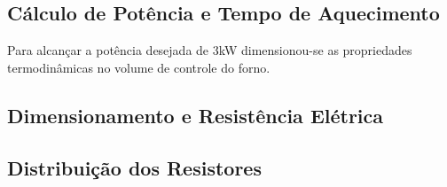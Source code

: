 \subsection{Cálculo de Potência e Tempo de Aquecimento}

Para alcançar a potência desejada de 3kW dimensionou-se as propriedades termodinâmicas no volume de controle do forno.

\subsection{Dimensionamento e Resistência Elétrica}

\subsection{Distribuição dos Resistores}

